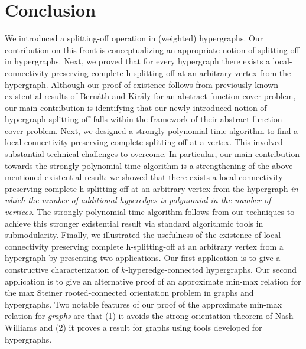 \documentclass{article}
\begin{document}
\section{Conclusion}\label{sec:conclusion}
We introduced a splitting-off operation in (weighted) hypergraphs. Our contribution on this front is conceptualizing an appropriate notion of splitting-off in hypergraphs. 
Next, we proved that for every hypergraph there exists a local-connectivity preserving complete h-splitting-off at an arbitrary vertex from the hypergraph.  
Although our proof of existence follows from previously known existential results of Bern\'{a}th and Kir\'{a}ly \cite{Bernath-Kiraly} for an abstract function cover problem, our main contribution is identifying that our newly introduced notion of hypergraph splitting-off falls within the framework of their abstract function cover problem. 
Next, we designed a strongly polynomial-time algorithm to find a local-connectivity preserving complete splitting-off at a vertex. This involved substantial technical challenges to overcome. In particular, our main contribution towards the strongly polynomial-time algorithm is a strengthening of the above-mentioned existential result: we showed that there exists a local connectivity preserving complete h-splitting-off at an arbitrary vertex from the hypergraph 
\emph{in which the number of additional hyperedges is polynomial in the number of vertices}. 
The strongly polynomial-time algorithm follows from our techniques to achieve this stronger existential result via standard algorithmic tools in submodularity. 
Finally, we illustrated the usefulness of the existence of local connectivity preserving complete h-splitting-off at an arbitrary vertex from a hypergraph by presenting two applications. 
Our first application is to give a constructive characterization of $k$-hyperedge-connected hypergraphs. Our second application is to give an alternative proof of an approximate min-max relation for 
the max Steiner rooted-connected orientation problem in graphs and hypergraphs. 
Two notable features of our proof of the approximate min-max relation for \emph{graphs} are that (1) it avoids the strong orientation theorem of Nash-Williams and (2) it proves a result for graphs using tools developed for hypergraphs. %
\end{document}
